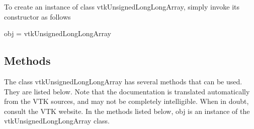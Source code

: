 To create an instance of class vtk\-Unsigned\-Long\-Long\-Array, simply invoke its constructor as follows \begin{DoxyVerb}  obj = vtkUnsignedLongLongArray
\end{DoxyVerb}
 \hypertarget{vtkwidgets_vtkxyplotwidget_Methods}{}\subsection{Methods}\label{vtkwidgets_vtkxyplotwidget_Methods}
The class vtk\-Unsigned\-Long\-Long\-Array has several methods that can be used. They are listed below. Note that the documentation is translated automatically from the V\-T\-K sources, and may not be completely intelligible. When in doubt, consult the V\-T\-K website. In the methods listed below, {\ttfamily obj} is an instance of the vtk\-Unsigned\-Long\-Long\-Array class. 
